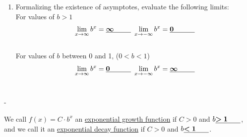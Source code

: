 \documentclass{article}
\makeatletter
\newlength{\tipmargin}
\renewenvironment{framed}{
  \setlength{\tipmargin}{\textwidth-\linewidth}
  \advance\@totalleftmargin-\tipmargin
  \def\FrameCommand{\hspace{\tipmargin}\fbox}%
  \advance\linewidth\tipmargin
  \MakeFramed {\advance\hsize-\width \FrameRestore}%
}
{\endMakeFramed}
\makeatother
\begin{document}
\begin{enumerate}[resume]
\begin{solution}
  \end{solution}

\item Formalizing the existence of asymptotes, evaluate the following limits: \\
For values of $b>1$
$$\lim_{x\to \infty} b^x = \fitb{0.5in}{\infty}\,\,  \lim_{x\to -\infty} b^x = \fitb{0.5in}{0}$$\\
For values of $b$ between 0 and 1, ($0<b<1$)
$$\lim_{x\to \infty} b^x = \fitb{0.5in}{0}\,\,  \lim_{x\to -\infty} b^x = \fitb{0.5in}{\infty}$$\\


\end{enumerate}
\begin{framed}
  We call $f(x) = C \cdot b^x$ an \uline{exponential growth function} if $C > 0$ and $b \fitb{0.5in}{> 1}$, and we call it an \uline{exponential decay function} if $C > 0$ and $b \fitb{0.5in}{< 1}$. 
\end{framed}
\end{document}
